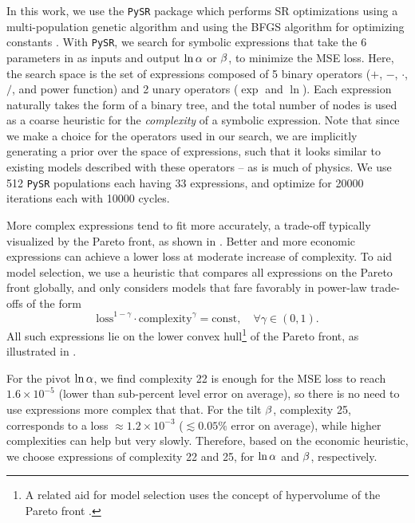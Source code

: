 In this work, we use the \texttt{PySR} package \cite{Cranmer2020b,
Cranmer2023} which performs SR optimizations using a multi-population
genetic algorithm and using the BFGS algorithm for optimizing constants
\cite{NocedalWright2006}.
With \texttt{PySR}, we search for symbolic expressions that take the 6
parameters in  as inputs and output $\ln\alpha$ or $\beta$,
to minimize the MSE loss.
Here, the search space is the set of expressions composed of 5 binary
operators ($+$, $-$, $\cdot$, $/$, and power function) and 2 unary
operators ($\exp$ and $\ln$).
Each expression naturally takes the form of a binary tree, and the total
number of nodes is used as a coarse heuristic for the \emph{complexity}
of a symbolic expression.
Note that since we make a choice for the operators used in our search,
we are implicitly generating a prior over the space of expressions, such
that it looks similar to existing models described with these operators
-- as is much of physics.
We use 512 \texttt{PySR} populations each having 33 expressions, and
optimize for 20000 iterations each with 10000 cycles.

More complex expressions tend to fit more accurately, a trade-off
typically visualized by the Pareto front, as shown in .
Better and more economic expressions can achieve a lower loss at
moderate increase of complexity.
To aid model selection, we use a heuristic that compares all expressions
on the Pareto front globally, and only considers models that fare
favorably in power-law trade-offs of the form
%
\begin{equation}
\mathrm{loss}^{1 - \gamma} \cdot \mathrm{complexity}^\gamma
= \mathrm{const}, \quad \forall \gamma \in (0, 1).
\end{equation}
All such expressions lie on the lower convex hull\footnote{A related aid
for model selection uses the concept of hypervolume of the Pareto front
\cite{Cao2015}.} of the Pareto front, as illustrated in
.

For the pivot $\ln\alpha$, we find complexity 22 is enough for the MSE loss
to reach $1.6 \times 10^{-5}$ (lower than sub-percent level error on
average), so there is no need to use expressions more complex that that.
For the tilt $\beta$, complexity 25, corresponds to a loss $\approx
1.2\times10^{-3}$ ($\lesssim 0.05\%$ error on average), while higher
complexities can help but very slowly.
Therefore, based on the economic heuristic, we choose expressions of
complexity 22 and 25, for $\ln\alpha$ and $\beta$, respectively.

